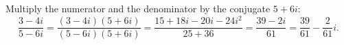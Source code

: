 Multiply the numerator and the denominator by the conjugate $5+6i$:
\[\dfrac{3-4i}{5-6i}=\dfrac{(3-4i)(5+6i)}{(5-6i)(5+6i)}=\dfrac{15+18i-20i-24i^2}{25+36}=\dfrac{39-2i}{61}=\boxed{\dfrac{39}{61}-\dfrac{2}{61}i}.\]
